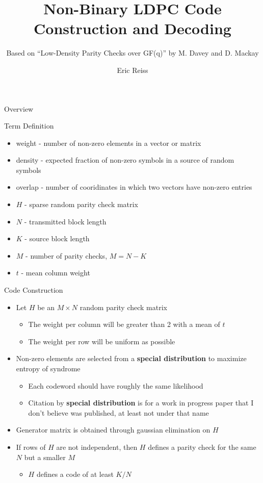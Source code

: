\documentclass[10pt,ignorenonframetext,]{beamer}
\title{Non-Binary LDPC Code Construction and Decoding}
\subtitle{Based on ``Low-Density Parity Checks over GF(q)'' by M. Davey
and D. Mackay}
\author{Eric Reiss}
\date{}
\providecommand{\tightlist}{%
  \setlength{\itemsep}{0pt}\setlength{\parskip}{0pt}}
\begin{document}
\frame{\titlepage}

\begin{frame}{Overview}
\protect\hypertarget{overview}{}
\end{frame}

\begin{frame}{Term Definition}
\protect\hypertarget{term-definition}{}
\begin{itemize}[<+->]
\tightlist
\item
  weight - number of non-zero elements in a vector or matrix
\item
  density - expected fraction of non-zero symbols in a source of random
  symbols
\item
  overlap - number of cooridinates in which two vectors have non-zero
  entries
\item
  \(H\) - sparse random parity check matrix
\item
  \(N\) - transmitted block length
\item
  \(K\) - source block length
\item
  \(M\) - number of parity checks, \(M=N-K\)
\item
  \(t\) - mean column weight
\end{itemize}
\end{frame}

\begin{frame}{Code Construction}
\protect\hypertarget{code-construction}{}
\begin{itemize}[<+->]
\tightlist
\item
  Let \(H\) be an \(M\times N\) random parity check matrix

  \begin{itemize}[<+->]
  \tightlist
  \item
    The weight per column will be greater than 2 with a mean of \(t\)
  \item
    The weight per row will be uniform as possible
  \end{itemize}
\item
  Non-zero elements are selected from a \textbf{special distribution} to
  maximize entropy of syndrome

  \begin{itemize}[<+->]
  \tightlist
  \item
    Each codeword should have roughly the same likelihood
  \item
    Citation by \textbf{special distribution} is for a work in progress
    paper that I don't believe was published, at least not under that
    name
  \end{itemize}
\item
  Generator matrix is obtained through gaussian elimination on \(H\)
\item
  If rows of \(H\) are not independent, then \(H\) defines a parity
  check for the same \(N\) but a smaller \(M\)

  \begin{itemize}[<+->]
  \tightlist
  \item
    \(H\) defines a code of at least \(K/N\)
  \end{itemize}
\end{itemize}
\end{frame}
\end{document}

